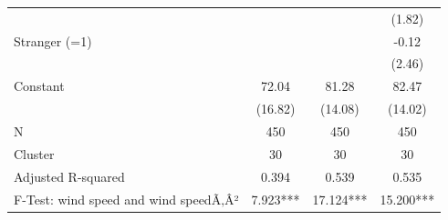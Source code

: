 {\begin{tabular}{l*{3}{c}}
                    &                     &                     &      (1.82)         \\
Stranger (=1)       &                     &                     &       -0.12         \\
                    &                     &                     &      (2.46)         \\
Constant            &       72.04\sym{***}&       81.28\sym{***}&       82.47\sym{***}\\
                    &     (16.82)         &     (14.08)         &     (14.02)         \\
\midrule
N                   &         450         &         450         &         450         \\
Cluster             &          30         &          30         &          30         \\
Adjusted R-squared  &       0.394         &       0.539         &       0.535         \\
F-Test: wind speed and wind speedÃ‚Â²&    7.923***         &   17.124***         &   15.200***         \\
\bottomrule
\end{tabular}
}
